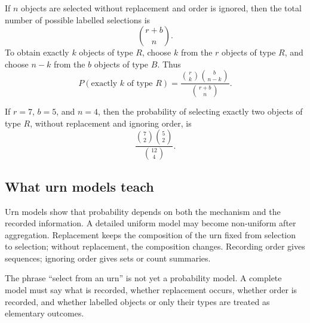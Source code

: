 If \(n\) objects are selected without replacement and order is ignored, then the
total number of possible labelled selections is
\[
\binom{r+b}{n}.
\]
To obtain exactly \(k\) objects of type \(R\), choose \(k\) from the \(r\) objects
of type \(R\), and choose \(n-k\) from the \(b\) objects of type \(B\). Thus
\[
P(\text{exactly }k\text{ of type }R)
=
\frac{\binom rk\binom b{n-k}}{\binom{r+b}{n}}.
\]

\begin{examplebox}
If \(r=7\), \(b=5\), and \(n=4\), then the probability of selecting exactly two
objects of type \(R\), without replacement and ignoring order, is
\[
\frac{\binom72\binom52}{\binom{12}{4}}.
\]
\end{examplebox}

\subsection*{What urn models teach}

Urn models show that probability depends on both the mechanism and the recorded
information. A detailed uniform model may become non-uniform after aggregation.
Replacement keeps the composition of the urn fixed from selection to selection;
without replacement, the composition changes. Recording order gives sequences;
ignoring order gives sets or count summaries.

\begin{remarkbox}
The phrase ``select from an urn'' is not yet a probability model. A complete
model must say what is recorded, whether replacement occurs, whether order is
recorded, and whether labelled objects or only their types are treated as
elementary outcomes.
\end{remarkbox}
